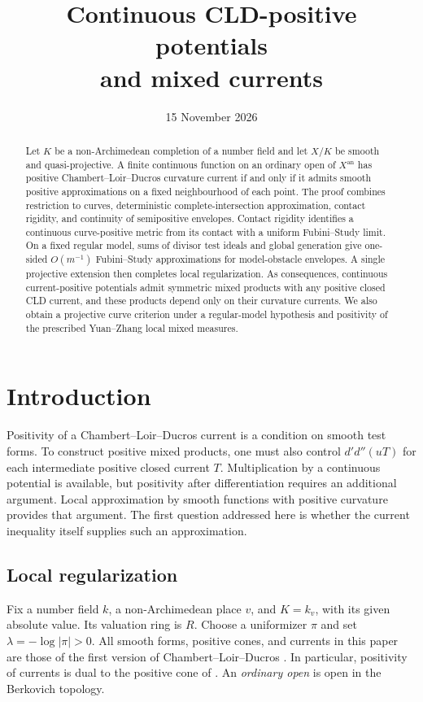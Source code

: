 \documentclass[11pt]{amsart}
\title[Continuous CLD-positive potentials]{Continuous CLD-positive potentials\\and mixed currents}
\author{}
\date{15 November 2026}
\theoremstyle{definition}
\theoremstyle{remark}
\numberwithin{equation}{section}
\newcommand{\ddc}{d'd''}
\newcommand{\an}{\mathrm{an}}
\begin{document}
\begin{abstract}
Let \(K\) be a non-Archimedean completion of a number field and let
\(X/K\) be smooth and quasi-projective. A finite continuous function on an
ordinary open of \(X^\an\) has positive Chambert--Loir--Ducros curvature
current if and only if it admits smooth positive approximations on a
fixed neighbourhood of each point. The proof combines restriction to
curves, deterministic complete-intersection approximation, contact
rigidity, and continuity of semipositive envelopes. Contact rigidity
identifies a continuous curve-positive metric from its contact with a
uniform Fubini--Study limit.
On a fixed regular model, sums of divisor test ideals and global generation
give one-sided \(O(m^{-1})\) Fubini--Study approximations for model-obstacle
envelopes. A single projective extension then completes local regularization. As consequences, continuous current-positive potentials admit
symmetric mixed products with any positive closed CLD current, and these
products depend only on their curvature currents. We also obtain a
projective curve criterion under a regular-model hypothesis and positivity
of the prescribed Yuan--Zhang local mixed measures.
\end{abstract}
\maketitle
\setcounter{tocdepth}{1}
\tableofcontents
\clearpage

\section{Introduction}\label{sec:introduction}

Positivity of a Chambert--Loir--Ducros current is a condition on smooth
test forms. To construct positive mixed products, one must also control
\(\ddc(uT)\) for each intermediate positive closed current \(T\).
Multiplication by a continuous potential is available, but positivity
after differentiation requires an additional argument. Local
approximation by smooth functions with positive curvature provides
that argument. The first question addressed here is whether the
current inequality itself supplies such an approximation.

\subsection{Local regularization}
Fix a number field \(k\), a non-Archimedean place \(v\), and
\(K=k_v\), with its given absolute value. Its valuation ring is \(R\).
Choose a uniformizer \(\pi\) and set \(\lambda=-\log|\pi|>0\).
All smooth forms, positive cones, and currents in this paper are those
of the first version of Chambert--Loir--Ducros \cite{CLD12}.
In particular, positivity of currents is dual to the positive cone
of \cite[Definition 5.1.1(c)]{CLD12}. An \emph{ordinary open} is open
in the Berkovich topology.
\end{document}
